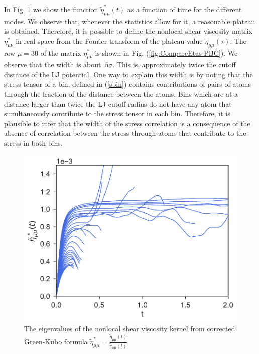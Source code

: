 \documentclass[b5paper,openright,10pt]{book}
\begin{document}
In    Fig.      \ref{fig:EtaStartFourier-PBC}    we    show     the    function
$\tilde{\eta}^{*}_{\mu\mu}(t)$  as a  function of  time for  the different
modes.   We observe  that, whenever  the  statistics allow  for it,  a
reasonable plateau  is obtained. Therefore,  it is possible  to define
the  nonlocal  shear  viscosity  matrix  $\eta^*_{\mu\nu}$ in real space  from  the
Fourier transform  of the plateau  value $\tilde{\eta}_{\mu\mu}(\tau)$.  
The row $\mu=30$ of the matrix $\eta^{*}_{\mu\nu}$ is shown in Fig. (\ref{fig:CompareEtas-PBC}). We observe that the width is about $~5\sigma$. This is, approximately twice the cutoff distance of the LJ potential. 
One way to  explain this width is  by noting
that  the stress  tensor of  a bin,  defined in  (\ref{sbin}) contains
contributions of pairs  of atoms through the fraction  of the distance
between the atoms. Bins which are  at a distance larger than twice the
LJ cutoff radius  do not have any atom  that simultaneously contribute
to the stress tensor in each  bin. Therefore, it is plausible to infer
that the width of the stress correlation is a consequence of the absence
of correlation between the stress through atoms that contribute to the stress
in both bins.
\begin{figure}[h!]
  \centering
\includegraphics[scale=0.41]{EtaStartFourier-PBC}
\caption[The nonlocal shear viscosity kernel for an unconfined fluid]{The eigenvalues of the nonlocal shear viscosity kernel from corrected Green-Kubo formula $\tilde{\eta}^*_{\mu\mu}=\frac{\tilde{\eta}_{\mu\mu}(t)}{\tilde{c}_{\mu\mu}(t)}$}
\label{fig:EtaStartFourier-PBC}
\end{figure}
\end{document}
